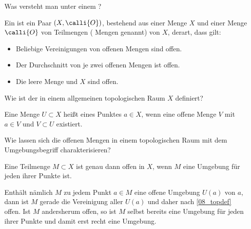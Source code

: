 \begin{frage}\label{08_topdef}
  Was versteht man unter einem ?
\end{frage}

\begin{selbeseite}
  \begin{antwort}
    Ein  ist ein Paar $(X, \calli{O})$, 
    bestehend aus einer Menge $X$ und einer Menge 
    $\calli{O}$ von Teilmengen ( Mengen genannt) 
    von $X$, derart, dass gilt:
    {\setlength{\labelsep}{7mm}
      \begin{itemize}
      \item[\desc{T1}] Beliebige Vereinigungen von offenen Mengen sind offen.
      \item[\desc{T2}] Der Durchschnitt von je zwei offenen Mengen ist offen.
      \item[\desc{T3}] Die leere Menge und $X$ sind offen.\AntEnd
      \end{itemize}}\vss
  \end{antwort}
\end{selbeseite}

\begin{frage}
  Wie ist der  
  in einem allgemeinen topologischen Raum $X$ definiert?
\end{frage}

\begin{antwort}
  Eine Menge $U\subset X$ heißt  eines Punktes $a\in X$, 
  wenn eine offene Menge $V$ mit $a\in V$ und $V\subset U$ existiert.
  \AntEnd
\end{antwort}

\begin{frage}
  Wie lassen sich die offenen Mengen in einem topologischen Raum mit dem 
  Umgebungsbegriff charakterisieren?
\end{frage}

\begin{antwort}
  Eine Teilmenge $M\subset X$ ist genau dann offen in $X$, 
  wenn $M$ eine Umgebung für jeden ihrer Punkte ist. 

  Enthält nämlich $M$ zu jedem Punkt $a\in M$ eine offene Umgebung $U(a)$ 
  von $a$, dann ist $M$ gerade die Vereinigung aller $U(a)$ und daher 
  nach \ref{08_topdef}\, offen. Ist $M$ andersherum offen, so ist 
  $M$ selbst bereits eine  Umgebung für jeden ihrer 
  Punkte und damit erst recht eine Umgebung.
  \AntEnd
\end{antwort}

